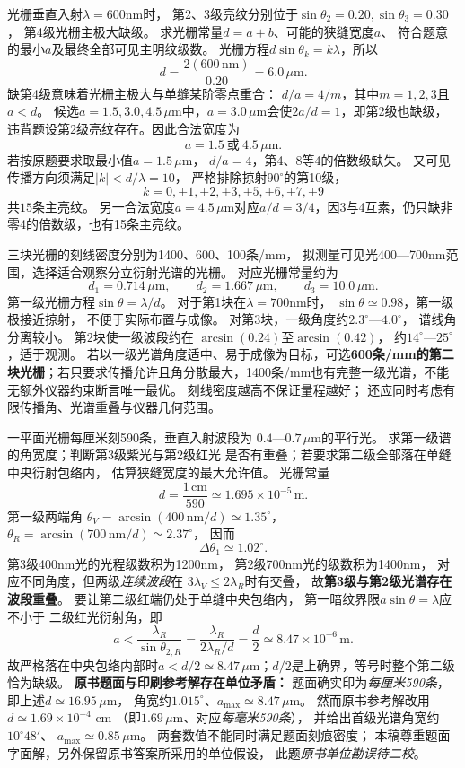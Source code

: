 \problemtext 光栅垂直入射$\lambda=600$nm时，
第2、3级亮纹分别位于$\sin\theta_2=0.20,\sin\theta_3=0.30$，
第4级光栅主极大缺级。
求光栅常量$d=a+b$、可能的狭缝宽度$a$、
符合题意的最小$a$及最终全部可见主明纹级数。
\workings
光栅方程$d\sin\theta_k=k\lambda$，所以
\[
\boxed{d=\frac{2(600\,\mathrm{nm})}{0.20}
=6.0\,\mu\mathrm m}.
\]
缺第4级意味着光栅主极大与单缝某阶零点重合：
$d/a=4/m$，其中$m=1,2,3$且$a<d$。
候选$a=1.5,3.0,4.5\,\mu\mathrm m$中，$a=3.0\,\mu\mathrm m$会使$2a/d=1$，即第2级也缺级，违背题设第2级亮纹存在。因此合法宽度为
\[
\boxed{a=1.5\ \text{或}\ 4.5\,\mu\mathrm m}.
\]
若按原题要求取最小值$a=1.5\,\mu$m，
$d/a=4$，第4、8等4的倍数级缺失。
又可见传播方向须满足$|k|<d/\lambda=10$，
严格排除掠射$90^\circ$的第10级，
\[
\boxed{k=0,\pm1,\pm2,\pm3,\pm5,\pm6,\pm7,\pm9}
\]
共$\boxed{15}$条主亮纹。
\crosscheck 另一合法宽度$a=4.5\,\mu$m对应$a/d=3/4$，因3与4互素，仍只缺非零4的倍数级，也有15条主亮纹。

\problemtext 三块光栅的刻线密度分别为1400、600、100条/mm，
拟测量可见光400—700nm范围，选择适合观察分立衍射光谱的光栅。
\workings
对应光栅常量约为
\[
d_1=0.714\,\mu\mathrm m,\qquad
d_2=1.667\,\mu\mathrm m,\qquad
d_3=10.0\,\mu\mathrm m.
\]
第一级光栅方程$\sin\theta=\lambda/d$。
对于第1块在$\lambda=700$nm时，
$\sin\theta\simeq0.98$，第一级极接近掠射，
不便于实际布置与成像。
对第3块，一级角度约$2.3^\circ$—$4.0^\circ$，
谱线角分离较小。
第2块使一级波段约在
$\arcsin(0.24)$至$\arcsin(0.42)$，
约$14^\circ$—$25^\circ$，适于观测。
若以一级光谱角度适中、易于成像为目标，可选\textbf{600条/mm的第二块光栅}；若只要求传播允许且角分散最大，1400条/mm也有完整一级光谱，不能无额外仪器约束断言唯一最优。
\crosscheck 刻线密度越高不保证量程越好；
还应同时考虑有限传播角、光谱重叠与仪器几何范围。

\problemtext 一平面光栅每厘米刻590条，垂直入射波段为
$0.4$—$0.7\,\mu$m的平行光。
求第一级谱的角宽度；判断第3级紫光与第2级红光
是否有重叠；若要求第二级全部落在单缝中央衍射包络内，
估算狭缝宽度的最大允许值。
\workings
光栅常量
\[
d=\frac{1\,\mathrm{cm}}{590}
\simeq1.695\times10^{-5}\,\mathrm m.
\]
第一级两端角
$\theta_V=\arcsin(400\,\mathrm{nm}/d)\simeq1.35^\circ$，
$\theta_R=\arcsin(700\,\mathrm{nm}/d)\simeq2.37^\circ$，
因而
\[
\boxed{\Delta\theta_1\simeq1.02^\circ}.
\]
第3级400nm光的光程级数积为1200nm，
第2级700nm光的级数积为1400nm，
对应不同角度，但两级\emph{连续波段}在
$3\lambda_V\le2\lambda_R$时有交叠，
故\textbf{第3级与第2级光谱存在波段重叠}。
要让第二级红端仍处于单缝中央包络内，
第一暗纹界限$a\sin\theta=\lambda$应不小于
二级红光衍射角，即
\[
a<\frac{\lambda_R}{\sin\theta_{2,R}}
=\frac{\lambda_R}{2\lambda_R/d}
=\frac d2
\simeq8.47\times10^{-6}\,\mathrm m.
\]
故严格落在中央包络内部时$a<d/2\simeq8.47\,\mu$m；$d/2$是上确界，等号时整个第二级恰为缺级。
\crosscheck \textbf{原书题面与印刷参考解存在单位矛盾：}
题面确实印为\emph{每厘米590条}，即上述$d\simeq16.95\,\mu$m，
角宽约$1.015^\circ$、$a_{\max}\simeq8.47\,\mu$m。
然而原书参考解改用$d\simeq1.69\times10^{-4}$ cm
（即$1.69\,\mu$m、对应\emph{每毫米590条}），
并给出首级光谱角宽约$10^\circ48'$、
$a_{\max}\simeq0.85\,\mu$m。
两套数值不能同时满足题面刻痕密度；
本稿尊重题面字面解，另外保留原书答案所采用的单位假设，
此题\emph{原书单位勘误待二校}。



